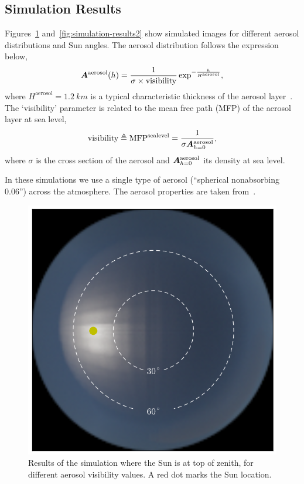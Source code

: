 \documentclass[10pt,twocolumn,letterpaper]{article}
\newcommand{\mat}[1]{\bm{#1}}
\begin{document}
\subsection{Simulation Results}
\label{sec:simulation-results}

Figures~\ref{fig:simulation-results1}
and~\ref{fig:simulation-results2} show simulated images for different
aerosol distributions and Sun angles.  The aerosol distribution
follows the expression below,
\begin{align}
  \mat{A}^{\rm aerosol}(h) = \frac{1}{\sigma \times \rm{visibility}}
  \exp^{-\frac{h}{H^\mathrm{aerosol}}},
\end{align}
where $H^\mathrm{aerosol}=1.2\ km$ is a typical characteristic
thickness of the aerosol layer~\cite{Levi1980}. The `visibility'
parameter is related to the mean free path (MFP) of the aerosol layer
at sea level,
\begin{align}
  \mathrm{visibility} \triangleq \mathrm{MFP^{sea
      level}}=\frac{1}{\sigma \mat{A}^{\rm aerosol}_{h=0}},
\end{align}
where $\sigma$ is the cross section of the aerosol and $\mat{A}^{\rm
  aerosol}_{h=0}$ its density at sea level.

In these simulations we use a single type of aerosol (``spherical nonabsorbing 0.06'') across the
atmosphere. The aerosol properties are taken
from~\cite{Martonchik2009}.

\begin{figure}
 \includegraphics[width=\columnwidth]{images/ref_img34.png}
  \caption{Results of the simulation where the Sun is at top of
    zenith, for different aerosol visibility values. A red dot marks
    the Sun location.}
  \label{fig:simulation-results1}
\end{figure}
\end{document}
